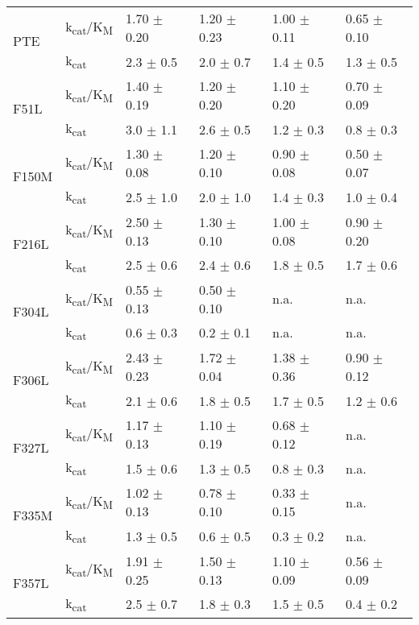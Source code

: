 \begin{refsection}
\begin{table}[htbp]
\begin{tabular}{llllll}
    \multirow{2}{*}{PTE}    & k\textsubscript{cat}/K\textsubscript{M} & 1.70 $
    \pm$ 0.20 & 1.20 $\pm$ 0.23 & 1.00 $\pm$ 0.11 & 0.65 $\pm$ 0.10 \\
    & k\textsubscript{cat} & 2.3 $\pm$ 0.5 & 2.0 $\pm$ 0.7 & 1.4 $\pm$ 0.5 & 1.3
    $\pm$ 0.5 \\
    \hline
    \multirow{2}{*}{F51L}  & k\textsubscript{cat}/K\textsubscript{M} & 1.40
    $\pm$ 0.19 & 1.20 $\pm$ 0.20 & 1.10 $\pm$ 0.20 & 0.70 $\pm$ 0.09 \\
    & k\textsubscript{cat} & 3.0 $\pm$ 1.1 & 2.6 $\pm$ 0.5 & 1.2 $\pm$ 0.3 &
    0.8 $\pm$ 0.3 \\
    \hline
    \multirow{2}{*}{F150M} & k\textsubscript{cat}/K\textsubscript{M} &
    1.30 $\pm$ 0.08 & 1.20 $\pm$ 0.10 & 0.90 $\pm$ 0.08 & 0.50 $\pm$ 0.07 \\
    & k\textsubscript{cat} & 2.5 $\pm$ 1.0 & 2.0 $\pm$ 1.0 & 1.4 $\pm$ 0.3 &
    1.0 $\pm$ 0.4 \\
    \hline
    \multirow{2}{*}{F216L} & k\textsubscript{cat}/K\textsubscript{M}
    & 2.50 $\pm$ 0.13 & 1.30 $\pm$ 0.10 & 1.00 $\pm$ 0.08 & 0.90 $\pm$ 0.20 \\
    & k\textsubscript{cat} & 2.5 $\pm$ 0.6 & 2.4 $\pm$ 0.6 & 1.8 $\pm$ 0.5 &
    1.7 $\pm$ 0.6 \\
    \hline
    \multirow{2}{*}{F304L}  & k\textsubscript{cat}/K\textsubscript{M} & 0.55
    $\pm$ 0.13 & 0.50 $\pm$ 0.10 & n.a. & n.a. \\
    & k\textsubscript{cat} & 0.6 $\pm$ 0.3 & 0.2 $\pm$ 0.1& n.a. & n.a. \\
    \hline
    \multirow{2}{*}{F306L}  & k\textsubscript{cat}/K\textsubscript{M} & 2.43
    $\pm$ 0.23 & 1.72 $\pm$ 0.04 & 1.38 $\pm$ 0.36 & 0.90 $\pm$ 0.12 \\
    & k\textsubscript{cat} & 2.1 $\pm$ 0.6 & 1.8 $\pm$ 0.5 & 1.7 $\pm$ 0.5 &
    1.2 $\pm$ 0.6 \\
    \hline
    \multirow{2}{*}{F327L}  & k\textsubscript{cat}/K\textsubscript{M} & 1.17
    $\pm$ 0.13 & 1.10 $\pm$ 0.19 & 0.68 $\pm$ 0.12 & n.a. \\
    & k\textsubscript{cat} & 1.5 $\pm$ 0.6 & 1.3 $\pm$ 0.5 & 0.8 $\pm$ 0.3 &
    n.a. \\
    \hline
    \multirow{2}{*}{F335M}  & k\textsubscript{cat}/K\textsubscript{M} & 1.02
    $\pm$ 0.13 & 0.78 $\pm$ 0.10 & 0.33 $\pm$ 0.15 & n.a. \\
    & k\textsubscript{cat} & 1.3 $\pm$ 0.5 & 0.6 $\pm$ 0.5 & 0.3 $\pm$ 0.2 &
    n.a. \\
    \hline
    \multirow{2}{*}{F357L}  & k\textsubscript{cat}/K\textsubscript{M} & 1.91
    $\pm$ 0.25 & 1.50 $\pm$ 0.13 & 1.10 $\pm$ 0.09 & 0.56 $\pm$ 0.09 \\
    & k\textsubscript{cat} & 2.5 $\pm$ 0.7 & 1.8 $\pm$ 0.3 & 1.5 $\pm$ 0.5 &
    0.4 $\pm$ 0.2 \\


\end{tabular}
\end{table}
\end{refsection}
